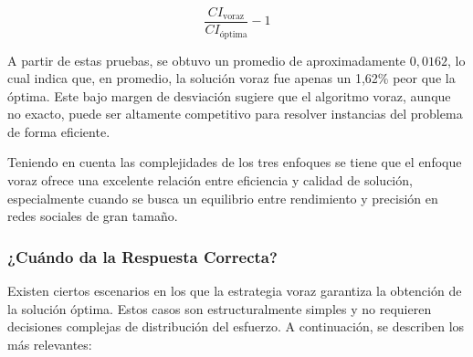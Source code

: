 \documentclass[11pt,letter]{article}
\begin{document}
    \[
        \frac{CI_{\text{voraz}}}{CI_{\text{óptima}}} - 1
    \]
    \vspace{0.5cm}

    A partir de estas pruebas, se obtuvo un promedio de aproximadamente $0{,}0162$, lo cual indica que, en promedio, la solución voraz fue apenas un 1,62\% peor que la óptima. Este bajo margen de desviación sugiere que el algoritmo voraz, aunque no exacto, puede ser altamente competitivo para resolver instancias del problema de forma eficiente.


    Teniendo en cuenta las complejidades de los tres enfoques se tiene que el enfoque voraz ofrece una excelente relación entre eficiencia y calidad de solución, especialmente cuando se busca un equilibrio entre rendimiento y precisión en redes sociales de gran tamaño.

    \subsubsection{¿Cuándo da la Respuesta Correcta?}

    Existen ciertos escenarios en los que la estrategia voraz garantiza la obtención de la solución óptima. Estos casos son estructuralmente simples y no requieren decisiones complejas de distribución del esfuerzo. A continuación, se describen los más relevantes:
\end{document}
